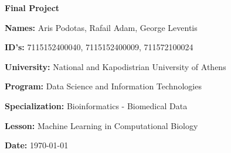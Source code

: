 \documentclass[12pt, a4paper]{article}
\author{Aris Podotas}
\date{\today}
\begin{document}
    \begin{titlepage}
        \centering
        {\huge \textbf{Final Project}\par}
        \vspace{0.5cm}
        {\Large \textbf{Names:} Aris Podotas, Rafail Adam, George Leventis\par}
        \vspace{0.5cm}
        {\Large \textbf{ID's:} 7115152400040, 7115152400009, 711572100024\par}
        \vspace{0.5cm}
        {\large \textbf{University:} National and Kapodistrian University of Athens\par}
        \vspace{0.5cm}
        {\large \textbf{Program:} Data Science and Information Technologies\par}
        \vspace{0.5cm}
        {\large \textbf{Specialization:} Bioinformatics - Biomedical Data\par}
        \vspace{0.5cm}
        {\large \textbf{Lesson:} Machine Learning in Computational Biology\par}
        \vspace{0.5cm}
        {\large \textbf{Date:} \today \par}
        \tableofcontents
    \end{titlepage}
\end{document}
